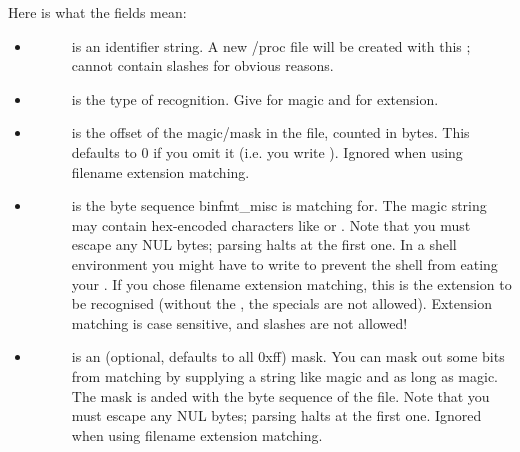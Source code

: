 \documentclass[a4paper,8pt,english]{sphinxmanual}
\begin{document}
Here is what the fields mean:
\begin{itemize}
\item {} \begin{description}
\item[{}] \leavevmode
is an identifier string. A new /proc file will be created with this
; cannot contain slashes \code{/} for
obvious reasons.

\end{description}

\item {} \begin{description}
\item[{}] \leavevmode
is the type of recognition. Give  for magic and  for extension.

\end{description}

\item {} \begin{description}
\item[{}] \leavevmode
is the offset of the magic/mask in the file, counted in bytes. This
defaults to 0 if you omit it (i.e. you write ).
Ignored when using filename extension matching.

\end{description}

\item {} \begin{description}
\item[{}] \leavevmode
is the byte sequence binfmt\_misc is matching for. The magic string
may contain hex-encoded characters like  or . Note that you
must escape any NUL bytes; parsing halts at the first one. In a shell
environment you might have to write  to prevent the shell from
eating your \code{\textbackslash{}}.
If you chose filename extension matching, this is the extension to be
recognised (without the , the  specials are not allowed).
Extension    matching is case sensitive, and slashes \code{/} are not allowed!

\end{description}

\item {} \begin{description}
\item[{}] \leavevmode
is an (optional, defaults to all 0xff) mask. You can mask out some
bits from matching by supplying a string like magic and as long as magic.
The mask is anded with the byte sequence of the file. Note that you must
escape any NUL bytes; parsing halts at the first one. Ignored when using
filename extension matching.


\end{description}
\end{itemize}
\end{document}

